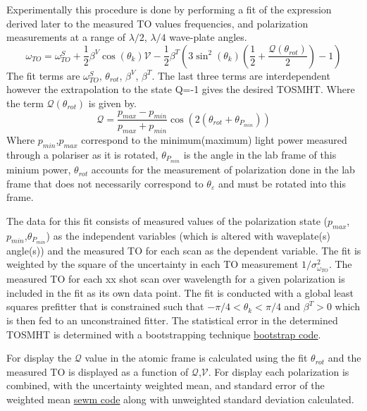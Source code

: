 \documentclass[aps,prl,
,reprint,
superscriptaddress,
onecolumn,
showpacs,preprintnumbers,
 amsmath,amssymb,
]{revtex4-1}
\begin{document}
Experimentally this procedure is done by performing a fit of the expression derived later to the measured TO values frequencies, and polarization measurements at a range of $\lambda/2$, $\lambda/4$ wave-plate angles.
\begin{equation}
    \omega_{TO} = \omega^{S}_{TO} + \frac{1}{2} \beta^V \cos \left( \theta_k \right) \mathcal{V}  - \frac{1}{2} \beta^T \left(3 \sin^2\left( \theta_k \right) \left(\frac{1}{2} +  \frac{\mathcal{Q}(\theta_{rot})}{2}\right) -1 \right)
\end{equation}
The fit terms are $\omega^{S}_{TO}$, $\theta_{rot}$, $\beta^V$, $\beta^T$. The last three terms are interdependent however the extrapolation to the state Q=-1 gives the desired TOSMHT.
Where the term $\mathcal{Q}(\theta_{rot})$ is given by.
\begin{equation}
 \mathcal{Q} =\frac{p_{max}-p_{min}}{p_{max}+p_{min}} \cos(2(\theta_{rot}+\theta_{P_{min}}))
\end{equation}
Where $p_{min}$,$p_{max}$ correspond to the minimum(maximum) light power measured through a polariser as it is rotated, $\theta_{P_{min}}$ is the angle in the lab frame of this minium power, $\theta_{rot}$ accounts for the measurement of polarization done in the lab frame that does not necessarily correspond to $\theta_\varepsilon$ and must be rotated into this frame.



The data for this fit consists of measured values of the polarization state ($p_{max}$,$p_{min}$,$\theta_{P_{min}}$) as the independent variables (which is altered with waveplate(s) angle(s)) and the measured TO for each scan as the dependent variable. The fit is weighted by the square of the uncertainty in each TO measurement $1/\sigma^2_{\omega_{TO}}$. The measured TO for each xx shot scan over wavelength for a given polarization is included in the fit as its own data point. The fit is conducted with a global least squares prefitter that is constrained such that $-\pi/4<\theta_k<\pi/4$ and  $\beta^T>0$ which is then fed to an unconstrained fitter. The statistical error in the determined TOSMHT is determined with a bootstrapping technique  \href{https://github.com/brycehenson/bootstrap_error}{bootstrap code}. 



For display the $\mathcal{Q}$ value in the atomic frame is calculated using the fit $\theta_{rot}$ and the measured TO is displayed as a function of $\mathcal{Q}$,$\mathcal{V}$. For display each polarization is combined, with the uncertainty weighted mean, and standard error of the weighted mean \href{https://github.com/spicydonkey/sewm}{sewm code} along with unweighted standard deviation calculated.
\end{document}
